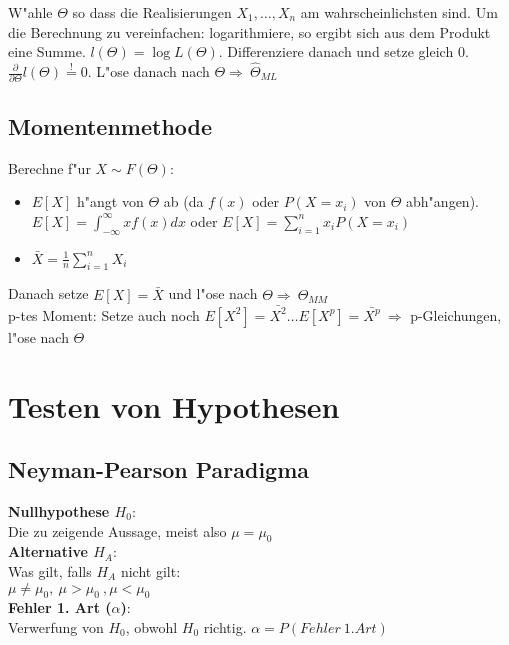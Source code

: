 \documentclass[10pt, a4paper, twocolumn]{scrartcl}
\begin{document}
W"ahle $\Theta$ so dass die Realisierungen $X_1,\ldots,X_n$ am wahrscheinlichsten sind. Um die Berechnung zu vereinfachen: logarithmiere, so ergibt sich aus dem Produkt eine Summe. $l(\Theta)=\log L(\Theta)$. Differenziere danach und setze gleich 0. $\frac{\partial}{\partial\Theta}l(\Theta)\stackrel{!}{=}0$. L"ose danach nach $\Theta \Rightarrow\:\hat{\Theta}_{ML}$


\subsection{Momentenmethode}

Berechne f"ur $X\sim F(\Theta)$:
\begin{itemize}
 \item $E[X]$ h"angt von $\Theta$ ab (da $f(x)$ oder $P(X=x_i)$ von $\Theta$ abh"angen).\\
  $E[X]=\int^\infty_{-\infty}xf(x)dx$ oder $E[X]=\sum\limits_{i=1}^n x_iP(X=x_i)$
 \item $\bar{X}=\frac{1}{n}\sum\limits^n_{i=1}X_i$
\end{itemize}

Danach setze $E[X]=\bar{X}$ und l"ose nach $\Theta\Rightarrow\:\hat{\Theta}_{MM}$\\

p-tes Moment: Setze auch noch $E[X^2]=\bar{X^2}\ldots E[X^p]=\bar{X^p}\:\Rightarrow$ p-Gleichungen, l"ose nach $\Theta$

\section{Testen von Hypothesen}

\subsection{Neyman-Pearson Paradigma}

\textbf{Nullhypothese $H_0$}:\\
Die zu zeigende Aussage, meist also $\mu=\mu_0$\\

\textbf{Alternative $H_A$}:\\
Was gilt, falls $H_A$ nicht gilt:\\
$\mu\neq\mu_0,\:\mu>\mu_0\:,\mu<\mu_0$\\

\textbf{Fehler 1. Art ($\alpha$)}:\\
Verwerfung von $H_0$, obwohl $H_0$ richtig. $\alpha=P(Fehler\:1.Art)$\\
\end{document}
